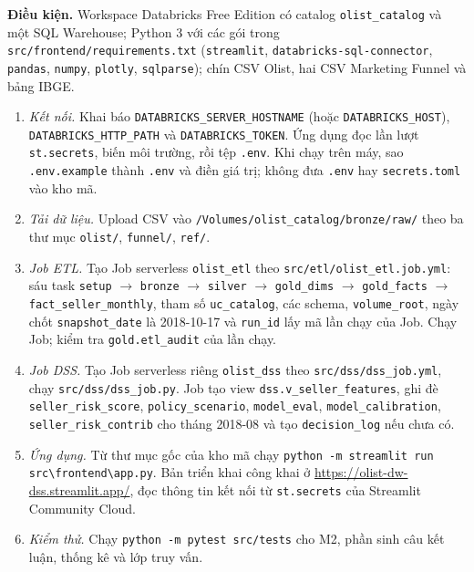 \documentclass[a4paper]{article}
\begin{document}
\textbf{Điều kiện.} Workspace Databricks Free Edition có catalog \texttt{olist\_\allowbreak{}catalog} và một SQL Warehouse; Python 3 với các gói trong \texttt{src/\allowbreak{}frontend/\allowbreak{}requirements.txt} (\texttt{streamlit}, \texttt{databricks-sql-connector}, \texttt{pandas}, \texttt{numpy}, \texttt{plotly}, \texttt{sqlparse}); chín CSV Olist, hai CSV Marketing Funnel và bảng IBGE.

\begin{enumerate}
  \item \textit{Kết nối.} Khai báo \texttt{DATABRICKS\_\allowbreak{}SERVER\_\allowbreak{}HOSTNAME} (hoặc \texttt{DATABRICKS\_\allowbreak{}HOST}), \texttt{DATABRICKS\_\allowbreak{}HTTP\_\allowbreak{}PATH} và \texttt{DATABRICKS\_\allowbreak{}TOKEN}. Ứng dụng đọc lần lượt \texttt{st.secrets}, biến môi trường, rồi tệp \texttt{.env}. Khi chạy trên máy, sao \texttt{.env.example} thành \texttt{.env} và điền giá trị; không đưa \texttt{.env} hay \texttt{secrets.toml} vào kho mã.
  \item \textit{Tải dữ liệu.} Upload CSV vào \texttt{/\allowbreak{}Volumes/\allowbreak{}olist\_\allowbreak{}catalog/\allowbreak{}bronze/\allowbreak{}raw/\allowbreak{}} theo ba thư mục \texttt{olist/}, \texttt{funnel/}, \texttt{ref/}.
  \item \textit{Job ETL.} Tạo Job serverless \texttt{olist\_\allowbreak{}etl} theo \texttt{src/\allowbreak{}etl/\allowbreak{}olist\_\allowbreak{}etl.job.yml}: sáu task \texttt{setup} $\rightarrow$ \texttt{bronze} $\rightarrow$ \texttt{silver} $\rightarrow$ \texttt{gold\_\allowbreak{}dims} $\rightarrow$ \texttt{gold\_\allowbreak{}facts} $\rightarrow$ \texttt{fact\_\allowbreak{}seller\_\allowbreak{}monthly}, tham số \texttt{uc\_\allowbreak{}catalog}, các schema, \texttt{volume\_\allowbreak{}root}, ngày chốt \texttt{snapshot\_\allowbreak{}date} là 2018-10-17 và \texttt{run\_\allowbreak{}id} lấy mã lần chạy của Job. Chạy Job; kiểm tra \texttt{gold.etl\_\allowbreak{}audit} của lần chạy.
  \item \textit{Job DSS.} Tạo Job serverless riêng \texttt{olist\_\allowbreak{}dss} theo \texttt{src/\allowbreak{}dss/\allowbreak{}dss\_\allowbreak{}job.yml}, chạy \texttt{src/\allowbreak{}dss/\allowbreak{}dss\_\allowbreak{}job.py}. Job tạo view \texttt{dss.v\_\allowbreak{}seller\_\allowbreak{}features}, ghi đè \texttt{seller\_\allowbreak{}risk\_\allowbreak{}score}, \texttt{policy\_\allowbreak{}scenario}, \texttt{model\_\allowbreak{}eval}, \texttt{model\_\allowbreak{}calibration}, \texttt{seller\_\allowbreak{}risk\_\allowbreak{}contrib} cho tháng 2018-08 và tạo \texttt{decision\_\allowbreak{}log} nếu chưa có.
  \item \textit{Ứng dụng.} Từ thư mục gốc của kho mã chạy \texttt{python -m streamlit run src\textbackslash frontend\textbackslash app.py}. Bản triển khai công khai ở \url{https://olist-dw-dss.streamlit.app/}, đọc thông tin kết nối từ \texttt{st.secrets} của Streamlit Community Cloud.
  \item \textit{Kiểm thử.} Chạy \texttt{python -m pytest src/tests} cho M2, phần sinh câu kết luận, thống kê và lớp truy vấn.
\end{enumerate}
\end{document}
